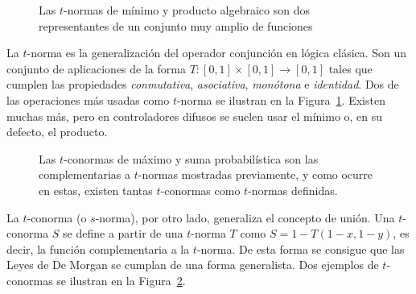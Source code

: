 \begin{figure}[t]
	\centering
	\qquad
	\caption[$t$-normas de mínimo y producto algebraico.]{Las $t$-normas de mínimo y producto algebraico son dos representantes de un conjunto muy amplio de funciones}
	\label{fig:t-norms}
\end{figure}

La $t$-norma es la generalización del operador conjunción en lógica clásica. Son un conjunto de aplicaciones de la forma $T: [0, 1] \times [0, 1] \rightarrow [0, 1]$ tales que cumplen las propiedades \textit{conmutativa}, \textit{asociativa}, \textit{monótona} e \textit{identidad}. Dos de las operaciones más usadas como $t$-norma se ilustran en la Figura~\ref{fig:t-norms}. Existen muchas más, pero en controladores difusos se suelen usar el mínimo o, en su defecto, el producto.

\begin{figure}[!b]
	\centering
	\qquad
	\caption[$t$-conormas de máximo y suma probabilística]{Las $t$-conormas de máximo y suma probabilística son las complementarias a $t$-normas mostradas previamente, y como ocurre en estas, existen tantas $t$-conormas como $t$-normas definidas.}
	\label{fig:t-conorms}
\end{figure}

La $t$-conorma (o $s$-norma), por otro lado, generaliza el concepto de unión. Una $t$-conorma $S$ se define a partir de una $t$-norma $T$ como $S = 1 - T(1-x, 1-y)$, es decir, la función complementaria a la $t$-norma. De esta forma se consigue que las Leyes de De Morgan se cumplan de una forma generalista. Dos ejemplos de $t$-conormas se ilustran en la Figura~\ref{fig:t-conorms}.


